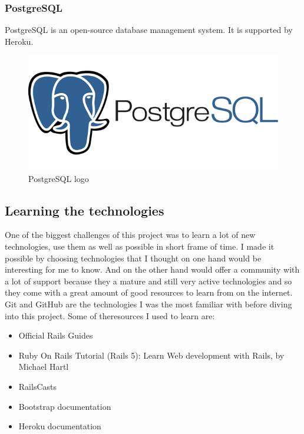 \documentclass[12pt,a4paper]{article}
\begin{document}
\subsubsection{PostgreSQL}
PostgreSQL is an open-source database management system. It is supported by
Heroku.

\begin{figure}[h]
   \centering
   \includegraphics[scale=0.3]{src/postgres_logo.png}
   \caption{\label{fig:ghlogo} PostgreSQL logo}
\end{figure}

\subsection{Learning the technologies}

One of the biggest challenges of this project was to learn a lot of new
technologies, use them as well as possible in short frame of time. I made it
possible by choosing technologies that I thought on one hand would be
interesting for me to know. And on the other hand would offer a community with
a lot of support because they a mature and still very active technologies and
so they come with a great amount of good resources to learn from on the
internet. Git and GitHub are the technologies I was the most familiar with
before diving into this project.  Some of theresources I used to learn are:

\begin{itemize}  
\item Official Rails Guides
\item Ruby On Rails Tutorial (Rails 5): Learn Web development with Rails,
	by Michael Hartl
\item RailsCasts
\item Bootstrap documentation
\item Heroku documentation
\end{itemize}
\end{document}
